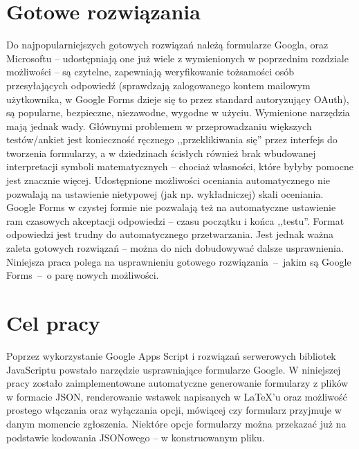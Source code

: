 \section{Gotowe rozwiązania}
Do najpopularniejszych gotowych rozwiązań należą formularze Googla, oraz Microsoftu -- udostępniają one już wiele z  wymienionych w poprzednim rozdziale możliwości -- są czytelne, zapewniają weryfikowanie  tożsamości osób przesyłających odpowiedź (sprawdzają zalogowanego kontem mailowym użytkownika, w Google Forms dzieje się  to przez standard autoryzujący OAuth), są popularne, bezpieczne, niezawodne, wygodne w użyciu.
\ind Wymienione narzędzia mają jednak wady. Głównymi problemem w przeprowadzaniu większych testów/ankiet jest konieczność ręcznego ,,przeklikiwania się'' przez interfejs do tworzenia formularzy, a w dziedzinach ścisłych również brak wbudowanej interpretacji symboli matematycznych -- chociaż własności, które byłyby pomocne jest znacznie więcej. Udostępnione możliwości oceniania automatycznego nie pozwalają na ustawienie nietypowej (jak np. wykładniczej) skali oceniania. Google Forms w czystej formie nie pozwalają też na automatyczne ustawienie ram czasowych akceptacji odpowiedzi -- czasu początku i końca ,,testu''. Format odpowiedzi jest trudny do automatycznego  przetwarzania.
\ind Jest jednak ważna zaleta gotowych rozwiązań -- można do nich dobudowywać dalsze usprawnienia. Niniejsza praca polega na usprawnieniu gotowego rozwiązania~--~jakim są Google Forms~--~o parę nowych możliwości.
\section{Cel pracy}
 Poprzez wykorzystanie Google Apps Script  i rozwiązań serwerowych bibliotek JavaScriptu powstało narzędzie usprawniające formularze Google. W niniejszej pracy zostało zaimplementowane automatyczne generowanie formularzy z plików w formacie JSON, renderowanie wstawek napisanych w \LaTeX{}'u oraz możliwość prostego włączania oraz wyłączania opcji, mówiącej czy formularz przyjmuje w danym momencie zgłoszenia. Niektóre opcje formularzy można  przekazać już na podstawie kodowania JSONowego -- w konstruowanym pliku.

